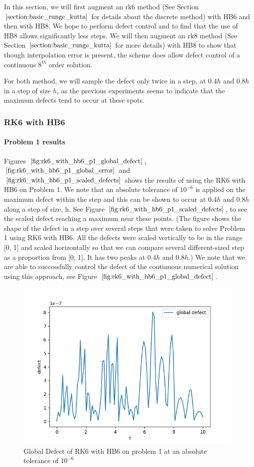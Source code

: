 \documentclass{article}
\begin{document}
In this section, we will first augment an rk6 method (See Section $\ref{section:basic_runge_kutta}$ for details about the discrete method) with HB6 and then with HB8. We hope to perform defect control and to find that the use of HB8 allows significantly less steps. We will then augment an rk8 method (See Section $\ref{section:basic_runge_kutta}$ for more details) with HB8 to show that though interpolation error is present, the scheme does allow defect control of a continuous $8^{th}$ order solution. 

For both method, we will sample the defect only twice in a step, at $0.4h$ and $0.8h$ in a step of size $h$, as the previous experiments seems to indicate that the maximum defects tend to occur at these spots.

\subsubsection{RK6 with HB6}
\paragraph{Problem 1 results}
Figures $\ref{fig:rk6_with_hb6_p1_global_defect}$, $\ref{fig:rk6_with_hb6_p1_global_error}$ and $\ref{fig:rk6_with_hb6_p1_scaled_defects}$ shows the results of using the RK6 with HB6 on Problem 1. We note that an absolute tolerance of $10^{-6}$ is applied on the maximum defect within the step and this can be shown to occur at $0.4h$ and $0.8h$ along a step of size, h. See Figure $\ref{fig:rk6_with_hb6_p1_scaled_defects}$, to see the scaled defect reaching a maximum near these points. (The figure shows the shape of the defect in a step over several steps that were taken to solve Problem 1 using RK6 with HB6. All the defects were scaled vertically to be in the range [0, 1] and scaled horizontally so that we can compare several different-sized step as a proportion from [0, 1]. It has two peaks at $0.4h$ and $0.8h$.) We note that we are able to successfully control the defect of the continuous numerical solution using this approach, see Figure $\ref{fig:rk6_with_hb6_p1_global_defect}$. 

\begin{figure}[H]
\centering
\includegraphics[width=0.7\linewidth]{./figures/rk6_with_hb6_p1_global_defect}
\caption{Global Defect of RK6 with HB6 on problem 1 at an absolute tolerance of $10^{-6}$}
\label{fig:rk6_with_hb6_p1_global_defect}
\end{figure}
\end{document}
